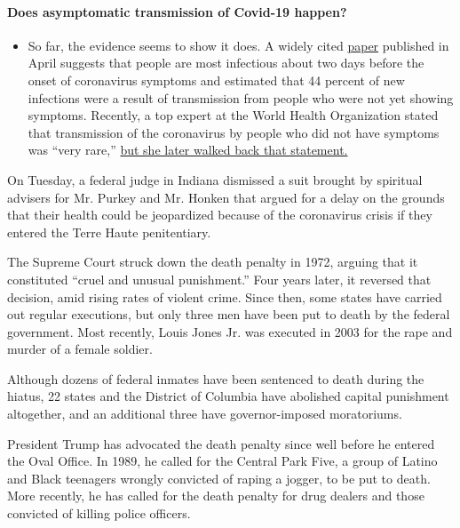 \begin{itemize}
{  \paragraph{Does asymptomatic transmission of Covid-19
  happen?}\label{does-asymptomatic-transmission-of-covid-19-happen}}

  \begin{itemize}
  \tightlist
  \item
    So far, the evidence seems to show it does. A widely cited
    \href{https://www.nature.com/articles/s41591-020-0869-5}{paper}
    published in April suggests that people are most infectious about
    two days before the onset of coronavirus symptoms and estimated that
    44 percent of new infections were a result of transmission from
    people who were not yet showing symptoms. Recently, a top expert at
    the World Health Organization stated that transmission of the
    coronavirus by people who did not have symptoms was ``very rare,''
    \href{https://www.nytimes.com/2020/06/09/world/coronavirus-updates.html?action=click\&pgtype=Article\&state=default\&region=MAIN_CONTENT_3\&context=storylines_faq\#link-1f302e21}{but
    she later walked back that statement.}
  \end{itemize}
\end{itemize}

On Tuesday, a federal judge in Indiana dismissed a suit brought by
spiritual advisers for Mr. Purkey and Mr. Honken that argued for a delay
on the grounds that their health could be jeopardized because of the
coronavirus crisis if they entered the Terre Haute penitentiary.

The Supreme Court struck down the death penalty in 1972, arguing that it
constituted ``cruel and unusual punishment.'' Four years later, it
reversed that decision, amid rising rates of violent crime. Since then,
some states have carried out regular executions, but only three men have
been put to death by the federal government. Most recently, Louis Jones
Jr. was executed in 2003 for the rape and murder of a female soldier.

Although dozens of federal inmates have been sentenced to death during
the hiatus, 22 states and the District of Columbia have abolished
capital punishment altogether, and an additional three have
governor-imposed moratoriums.

President Trump has advocated the death penalty since well before he
entered the Oval Office. In 1989, he called for the Central Park Five, a
group of Latino and Black teenagers wrongly convicted of raping a
jogger, to be put to death. More recently, he has called for the death
penalty for drug dealers and those convicted of killing police officers.

